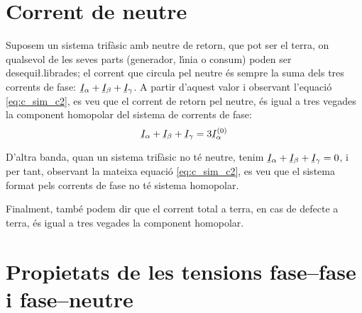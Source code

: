 \section{Corrent de neutre} 

Suposem un sistema trif\`{a}sic amb neutre de retorn, que pot ser el
terra, on qualsevol de les seves parts (generador, l\'{\i}nia o consum)
poden ser desequi{\l.l}ibrades; el corrent que circula pel neutre \'{e}s
sempre la suma dels tres corrents de fase: $\cmplx{I}_\alpha+
\cmplx{I}_\beta+\cmplx{I}_\gamma$. A partir d'aquest valor i
observant l'equaci\'{o} \eqref{eq:c_sim_c2}, es veu que el corrent de
retorn pel neutre, \'{e}s igual a tres vegades la component homopolar
del sistema de corrents de fase:
\begin{equation}
    \cmplx{I}_\alpha+\cmplx{I}_\beta+\cmplx{I}_\gamma =3 \cmplx{I}_\alpha\ap{(0)}
\end{equation}

D'altra banda, quan un sistema trif\`{a}sic no t\'{e} neutre, tenim
$\cmplx{I}_\alpha+ \cmplx{I}_\beta+\cmplx{I}_\gamma=0$, i per tant,
observant la mateixa equaci\'{o} \eqref{eq:c_sim_c2}, es veu que el
sistema format pels corrents de fase no t\'{e} sistema homopolar.

Finalment, tamb\'{e} podem dir que el corrent total a terra, en cas de
defecte a terra, \'{e}s igual a tres vegades la component homopolar.

\section{Propietats de les tensions fase--fase i fase--neutre}
 

